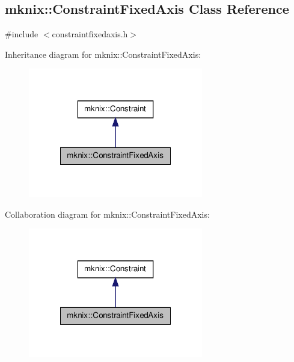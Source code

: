 \hypertarget{classmknix_1_1_constraint_fixed_axis}{\subsection{mknix\-:\-:Constraint\-Fixed\-Axis Class Reference}
\label{classmknix_1_1_constraint_fixed_axis}
}


{\ttfamily \#include $<$constraintfixedaxis.\-h$>$}



Inheritance diagram for mknix\-:\-:Constraint\-Fixed\-Axis\-:\nopagebreak
\begin{figure}[H]
\begin{center}
\leavevmode
\includegraphics[width=216pt]{dc/d32/classmknix_1_1_constraint_fixed_axis__inherit__graph}
\end{center}
\end{figure}


Collaboration diagram for mknix\-:\-:Constraint\-Fixed\-Axis\-:\nopagebreak
\begin{figure}[H]
\begin{center}
\leavevmode
\includegraphics[width=216pt]{d0/d58/classmknix_1_1_constraint_fixed_axis__coll__graph}
\end{center}
\end{figure}
